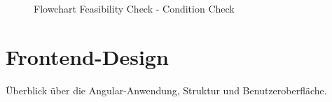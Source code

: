 \begin{figure}[!h]
    \centering
    \caption{Flowchart Feasibility Check - Condition Check }
    \label{fig:feasibility-check-condition-check}
\end{figure}

\section{Frontend-Design}
Überblick über die Angular-Anwendung, Struktur und Benutzeroberfläche.